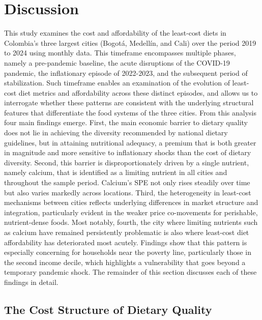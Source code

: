 \documentclass[Afour, sageh,times]{sagej}
\begin{document}
\section{Discussion}

This study examines the cost and affordability of the least-cost diets in Colombia's three largest cities (Bogotá, Medellín, and Cali) over the period 2019 to 2024 using monthly data. This timeframe encompasses multiple phases, namely a pre-pandemic baseline, the acute disruptions of the COVID-19 pandemic, the inflationary episode of 2022-2023, and the subsequent period of stabilization. Such timeframe enables an examination of the evolution of least-cost diet metrics and affordability across these distinct episodes, and allows us to interrogate whether these patterns are consistent with the underlying structural features that differentiate the food systems of the three cities. From this analysis four main findings emerge. First, the main economic barrier to dietary quality does not lie in achieving the diversity recommended by national dietary guidelines, but in attaining nutritional adequacy, a premium that is both greater in magnitude and more sensitive to inflationary shocks than the cost of dietary diversity. Second, this barrier is disproportionately driven by a single nutrient, namely calcium, that is identified as a limiting nutrient in all cities and throughout the sample period. Calcium's SPE not only rises steadily over time but also varies markedly across locations. Third, the heterogeneity in least-cost mechanisms between cities reflects underlying differences in market structure and integration, particularly evident in the weaker price co-movements for perishable, nutrient-dense foods. Most notably, fourth, the city where limiting nutrients such as calcium have remained persistently problematic is also where least-cost diet affordability has deteriorated most acutely. Findings show that this pattern is especially concerning for households near the poverty line, particularly those in the second income decile, which highlights a vulnerability that goes beyond a temporary pandemic shock. The remainder of this section discusses each of these findings in detail.

\subsection{The Cost Structure of Dietary Quality}
\end{document}
